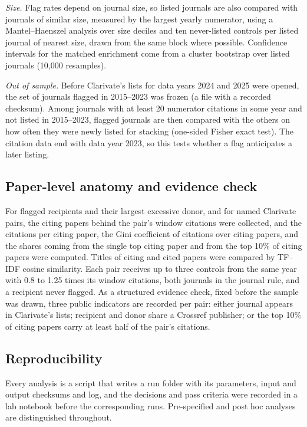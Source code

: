 \emph{Size.} Flag rates depend on journal size, so listed journals are also compared with journals of similar size,
measured by the largest yearly numerator, using a Mantel--Haenszel analysis over size deciles and ten never-listed
controls per listed journal of nearest size, drawn from the same block where possible. Confidence intervals for the
matched enrichment come from a cluster bootstrap over listed journals (10,000 resamples).

\emph{Out of sample.} Before Clarivate's lists for data years 2024 and 2025 were opened, the set of journals flagged in
2015--2023 was frozen (a file with a recorded checksum). Among journals with at least 20 numerator citations in some
year and not listed in 2015--2023, flagged journals are then compared with the others on how often they were newly
listed for stacking (one-sided Fisher exact test). The citation data end with data year 2023, so this tests whether a flag
anticipates a later listing.

\subsection{Paper-level anatomy and evidence check}
For flagged recipients and their largest excessive donor, and for named Clarivate pairs, the citing papers behind the pair's
window citations were collected, and the citations per citing paper, the Gini coefficient of citations
over citing papers, and the shares coming from the single top citing paper and from the top 10\% of citing papers were computed. Titles of citing and cited papers were compared by TF--IDF cosine similarity. Each pair receives up to three controls from
the same year with 0.8 to 1.25 times its window citations, both journals in the journal rule, and a recipient never
flagged. As a structured evidence check, fixed before the sample was drawn, three public indicators are recorded per
pair: either journal appears in Clarivate's lists; recipient and donor share a Crossref publisher; or the top 10\% of
citing papers carry at least half of the pair's citations.

\subsection{Reproducibility}
Every analysis is a script that writes a run folder with its parameters, input and output checksums and log, and the
decisions and pass criteria were recorded in a lab notebook before the corresponding runs. Pre-specified and post hoc analyses are distinguished throughout.

